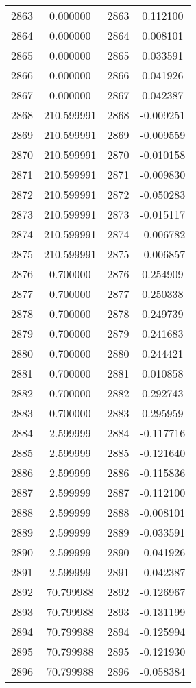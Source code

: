 \documentclass[12pt]{article}
\begin{document}
\begin{longtable}{@{}cccc@{}}
2863 & 0.000000 & 2863 & 0.112100 \\
2864 & 0.000000 & 2864 & 0.008101 \\
2865 & 0.000000 & 2865 & 0.033591 \\
2866 & 0.000000 & 2866 & 0.041926 \\
2867 & 0.000000 & 2867 & 0.042387 \\
2868 & 210.599991 & 2868 & -0.009251 \\
2869 & 210.599991 & 2869 & -0.009559 \\
2870 & 210.599991 & 2870 & -0.010158 \\
2871 & 210.599991 & 2871 & -0.009830 \\
2872 & 210.599991 & 2872 & -0.050283 \\
2873 & 210.599991 & 2873 & -0.015117 \\
2874 & 210.599991 & 2874 & -0.006782 \\
2875 & 210.599991 & 2875 & -0.006857 \\
2876 & 0.700000 & 2876 & 0.254909 \\
2877 & 0.700000 & 2877 & 0.250338 \\
2878 & 0.700000 & 2878 & 0.249739 \\
2879 & 0.700000 & 2879 & 0.241683 \\
2880 & 0.700000 & 2880 & 0.244421 \\
2881 & 0.700000 & 2881 & 0.010858 \\
2882 & 0.700000 & 2882 & 0.292743 \\
2883 & 0.700000 & 2883 & 0.295959 \\
2884 & 2.599999 & 2884 & -0.117716 \\
2885 & 2.599999 & 2885 & -0.121640 \\
2886 & 2.599999 & 2886 & -0.115836 \\
2887 & 2.599999 & 2887 & -0.112100 \\
2888 & 2.599999 & 2888 & -0.008101 \\
2889 & 2.599999 & 2889 & -0.033591 \\
2890 & 2.599999 & 2890 & -0.041926 \\
2891 & 2.599999 & 2891 & -0.042387 \\
2892 & 70.799988 & 2892 & -0.126967 \\
2893 & 70.799988 & 2893 & -0.131199 \\
2894 & 70.799988 & 2894 & -0.125994 \\
2895 & 70.799988 & 2895 & -0.121930 \\
2896 & 70.799988 & 2896 & -0.058384 \\

\end{longtable}
\end{document}
